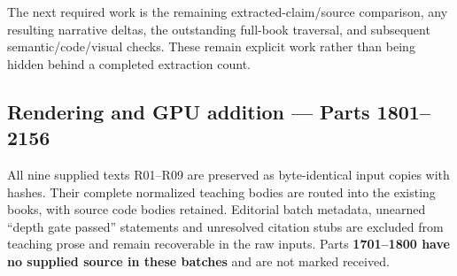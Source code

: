 The next required work is the remaining extracted-claim/source comparison, any resulting narrative deltas, the outstanding full-book traversal, and subsequent semantic/code/visual checks. These remain explicit work rather than being hidden behind a completed extraction count.

\subsection{Rendering and GPU addition --- Parts 1801--2156}\label{appendix-3b67654799a2-rendering-and-gpu-addition-parts-18012156}

All nine supplied texts R01--R09 are preserved as byte-identical input copies with hashes. Their complete normalized teaching bodies are routed into the existing books, with source code bodies retained. Editorial batch metadata, unearned ``depth gate passed'' statements and unresolved citation stubs are excluded from teaching prose and remain recoverable in the raw inputs. Parts \textbf{1701--1800 have no supplied source in these batches} and are not marked received.

